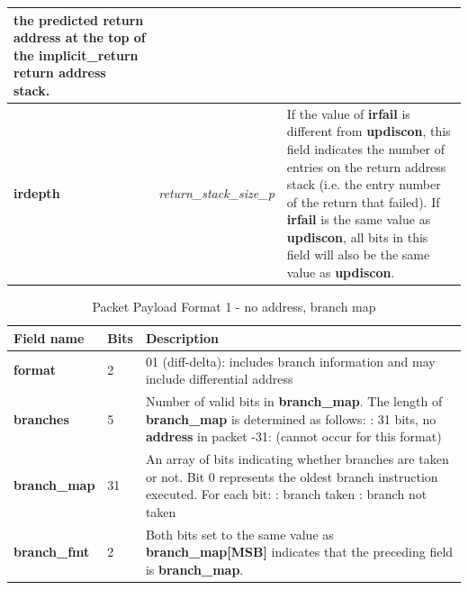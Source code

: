 \begin{table}[htp]
\begin{tabulary}{\textwidth}{|l|p{35mm}|p{80mm}|}
                the predicted return address at the top of the implicit\_return return address stack.\\
    \hline
    \textbf{irdepth}	& \textit {return\_stack\_size\_p} & 
                If the value of \textbf{irfail} is different from \textbf{updiscon}, this field indicates 
                the number of entries on the return address stack (i.e. the entry number of the return that
                failed).  If \textbf{irfail} is the same value as \textbf{updiscon}, all bits in this field 
                will also be the same value as \textbf{updiscon}. \\
    \hline
  \end{tabulary}
\end{table}

\begin{table}[htp]
  \centering
  \caption{Packet Payload Format 1  - no address, branch map}
  \label{tab:te_inst0-1-noaddr-map}
  \begin{tabulary}{\textwidth}{|l|p{35mm}|p{80mm}|}
    \hline
    {\bf Field name} & {\bf Bits} & {\bf Description} \\
    \hline
    \textbf{format}	& 2	& 01 (diff-delta): includes branch information and may include differential address\\
    \hline
    \textbf{branches} & 5 & Number of valid bits in \textbf{branch\_map}. The length of \textbf{branch\_map} is determined as follows: :    31 bits, no \textbf{address} in packet -31: (cannot occur for this format) \\
    \hline
    \textbf{branch\_map} & 31 & 
                 An array of bits indicating whether branches are taken or not.\newline
    Bit 0 represents the oldest branch instruction executed.   For each bit: : branch taken : branch not taken \\
    \hline
    \textbf{branch\_fmt} & 2  & Both bits set to the same value as \textbf{branch\_map[MSB]} indicates that the
    preceding field is \textbf{branch\_map}. \\
    \hline
  \end{tabulary}
\end{table}

